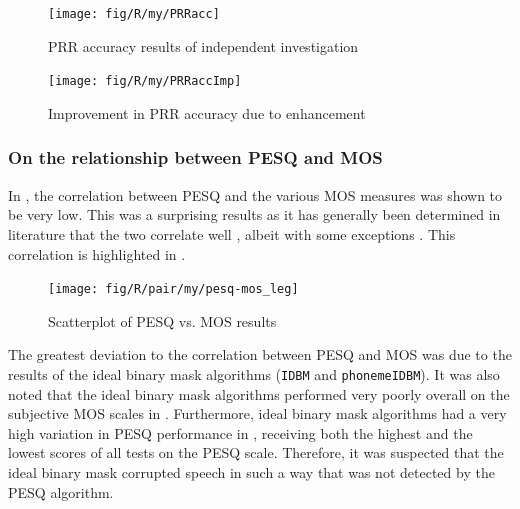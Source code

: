 \begin{figure}[h]
\noindent \begin{centering}
\texttt{[image: fig/R/my/PRRacc]}
\par\end{centering}

\protect\caption{\label{fig:my-PRRacc}\acs{PRR} accuracy results of independent investigation}
\end{figure}


\begin{figure}[h]
\noindent \begin{centering}
\texttt{[image: fig/R/my/PRRaccImp]}
\par\end{centering}

\protect\caption{\label{fig:my-PRRacc-imp}Improvement in \acs{PRR} accuracy due to
enhancement}
\end{figure}


\clearpage{}


\subsubsection*{On the relationship between \acs{PESQ} and \acs{MOS}}

In , the correlation between \ac{PESQ} and the various
\ac{MOS} measures was shown to be very low. This was a surprising
results as it has generally been determined in literature that the
two correlate well \citep{Kitawaki2007,Rix2003,Rix2001}, albeit with
some exceptions \citep{Liu2006}. This correlation is highlighted
in .

\begin{figure}[bh]

\texttt{[image: fig/R/pair/my/pesq-mos\_leg]}

\protect\caption{\label{fig:my-pesq-mos}Scatterplot of \acs{PESQ} vs. \acs{MOS}
results}
\end{figure}


The greatest deviation to the correlation between \ac{PESQ} and \ac{MOS}
was due to the results of the ideal binary mask algorithms (\lstinline!IDBM!
and \lstinline!phonemeIDBM!). It was also noted that the ideal binary
mask algorithms performed very poorly overall on the subjective \ac{MOS}
scales in . Furthermore,
ideal binary mask algorithms had a very high variation in \ac{PESQ}
performance in , receiving both the highest and the
lowest scores of all tests on the \ac{PESQ} scale. Therefore, it
was suspected that the ideal binary mask corrupted speech in such
a way that was not detected by the \ac{PESQ} algorithm.

